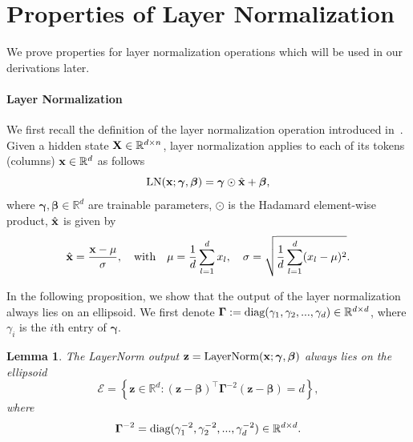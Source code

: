 \documentclass[journal]{IEEEtran}
\newcommand{\bfX}{{\bf X}}
\newcommand{\bfx}{{\bf x}}
\newcommand{\bfz}{{\bf z}}
\newcommand{\bfgamma}{{\boldsymbol \gamma}}
\newcommand{\bfGamma}{{\boldsymbol \Gamma}}
\newcommand{\bfbeta}{{\boldsymbol \beta}}
\theoremstyle{plain}
\newtheorem{lemma}[theorem]{Lemma}
\theoremstyle{definition}
\theoremstyle{remark}
\newcounter{tmpTheoremCounter}
\newcommand{\settheoremnumber}[1]{%
  \setcounter{tmpTheoremCounter}{\value{theorem}}%
  \setcounter{theorem}{\getrefnumber{#1}}%
  \addtocounter{theorem}{-1}%
}
\newcommand{\restoretheoremnumber}{%
  \setcounter{theorem}{\value{tmpTheoremCounter}}%
}
\begin{document}
\section{Properties of Layer Normalization}
We prove properties for layer normalization operations which will be used in our derivations later.

\paragraph{Layer Normalization} We first recall the definition of the layer normalization operation introduced in~. Given a hidden state $\bfX \in \mathbb{R}^{d \times n}$, layer normalization applies to each of its tokens (columns) $\bfx \in \mathbb{R}^d$ as follows
\begin{equation}\label{eq:LN_appendix}
    {\rm LN}(\bfx; \bfgamma, \bfbeta) = \bfgamma \odot \hat{\bfx} + \bfbeta,
\end{equation}
where $\bfgamma, \bfbeta \in \mathbb{R}^d$ are trainable parameters, $\odot$ is the Hadamard element-wise product, $\hat{\bfx}$ is given by
\begin{equation}\label{eq:standardized_appendix}
    \hat{\bfx} = \frac{\bfx - \mu}{\sigma}, \quad \text{with} \quad \mu = \frac{1}{d} \sum_{l=1}^d x_l, \quad \sigma = \sqrt{\frac{1}{d} \sum_{l=1}^d (x_l - \mu)^2}.
\end{equation}

In the following proposition, we show that the output of the layer normalization always lies on an ellipsoid. We first denote $\bfGamma := \textnormal{diag}(\gamma_1, \gamma_2, ..., \gamma_d) \in \mathbb{R}^{d\times d}$, where $\gamma_i$ is the $i$th entry of $\bfgamma$.

\settheoremnumber{lemma:ellipsoid}
\begin{lemma}
    The LayerNorm output $\bfz=\text{LayerNorm}(\bfx; \bfgamma, \bfbeta)$ always lies on the ellipsoid 
    $$
    \mathcal{E} = \left\{ \mathbf{z} \in \mathbb{R}^d : (\mathbf{z} - \bfbeta)^\top \bfGamma^{-2} (\mathbf{z} - \bfbeta) = d \right\},
    $$
    where
    \begin{equation}\label{eq:Sigma_diag}
    \bfGamma^{-2} = \textnormal{diag}(\gamma_1^{-2}, \gamma_2^{-2}, ..., \gamma_d^{-2}) \in \mathbb{R}^{d\times d}.
    \end{equation} 
\end{lemma}
\restoretheoremnumber
\end{document}
